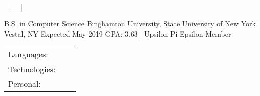 \documentclass[]{awesome-cv}
\begin{document}
\begin{center}
	\ \ \  \\
	\vspace{2mm}
	{\faEnvelope\ } | {\faPhone\ } | {\faLink\ }
\end{center}

\begin{cventries}
	\cventry
	{B.S. in Computer Science}
	{Binghamton University, State University of New York}
	{Vestal, NY}
	{Expected May 2019}
	{GPA: 3.63 | Upsilon Pi Epsilon Member}
\end{cventries}
\vspace{-2mm}

\begin{cventries}
	\cventry
	{}
	{\def\arraystretch{1.15}{\begin{tabular}{ l l }
		Languages:  & \ \ \skill{{ C++, Python, Java, C, HTML, CSS}} \\
		Technologies:  & \ \ \skill{{ MacOS, Linux, Windows, Git, Vim}} \\
		Personal:  & \ \ \skill{{ Communication, organization, teamwork, leadership, critical thinking}} \\
	\end{tabular}}}
	{}
	{}
	{}
\end{cventries}
\vspace{-9mm}
\end{document}
